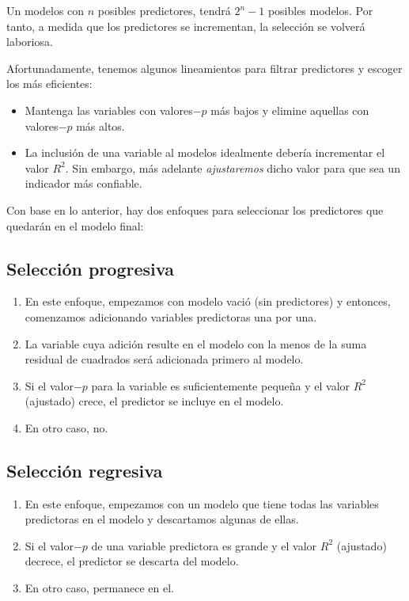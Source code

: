 \begin{observacion}
	Un modelos con $n$ posibles predictores, tendrá $2^{n}-1$ posibles modelos. Por tanto, a medida que los predictores se incrementan, la selección se volverá laboriosa.
\end{observacion}



Afortunadamente, tenemos algunos lineamientos para filtrar predictores y escoger los más eficientes:
\begin{itemize}
	\item Mantenga las variables con valores$-p$ más bajos y elimine aquellas con valores$-p$ más altos. 
	\item La inclusión de una variable al modelos idealmente debería incrementar el valor $R^{2}.$  Sin embargo, más adelante \emph{ajustaremos} dicho valor para que sea un indicador más confiable.
\end{itemize}


Con base en lo anterior, hay dos enfoques para seleccionar los predictores que quedarán en el modelo final:


\subsection{Selección progresiva}
\begin{enumerate}
	\item En este enfoque, empezamos con modelo vació (sin predictores) y entonces, comenzamos adicionando variables predictoras una por una. 
	\item La variable cuya adición resulte en el modelo con la menos de la suma residual de cuadrados será adicionada primero al modelo. \item Si el valor$-p$ para la variable es suficientemente pequeña y el valor $R^{2}$ (ajustado) crece, el predictor se incluye en el modelo. 
	\item En otro caso, no.
\end{enumerate}


\subsection{Selección regresiva}
\begin{enumerate}
	\item En este enfoque, empezamos con un modelo que tiene todas las variables predictoras en el modelo y descartamos algunas de ellas.
	
	
	\item Si el valor$-p$ de una variable predictora es grande y el valor $R^{2}$ (ajustado) decrece, el predictor se descarta del modelo.
	
	
	
	\item En otro caso, permanece en el.
\end{enumerate}



